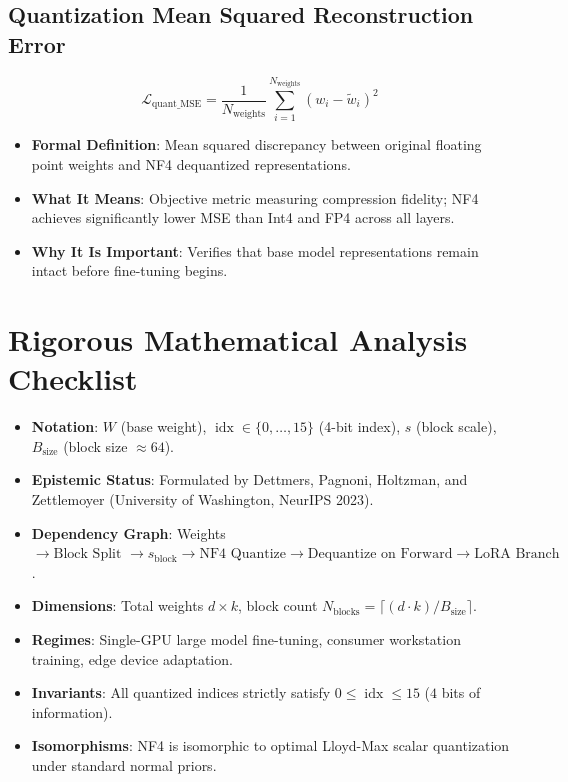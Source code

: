 \documentclass[11pt,a4paper]{article}
\theoremstyle{definition}
\begin{document}
\subsection{Quantization Mean Squared Reconstruction Error}
{\boldmath
\begin{equation}
\mathcal{L}_{\text{quant\_MSE}} = \frac{1}{N_{\text{weights}}}\sum_{i=1}^{N_{\text{weights}}} (w_i - \tilde{w}_i)^2
\end{equation}
}
\begin{itemize}
    \item \textbf{Formal Definition}: Mean squared discrepancy between original floating point weights and NF4 dequantized representations.
    \item \textbf{What It Means}: Objective metric measuring compression fidelity; NF4 achieves significantly lower MSE than Int4 and FP4 across all layers.
    \item \textbf{Why It Is Important}: Verifies that base model representations remain intact before fine-tuning begins.
\end{itemize}

\section{Rigorous Mathematical Analysis Checklist}

\begin{itemize}
    \item \textbf{Notation}: $W$ (base weight), $\operatorname{idx} \in \{0, \dots, 15\}$ (4-bit index), $s$ (block scale), $B_{\text{size}}$ (block size $\approx 64$).
    \item \textbf{Epistemic Status}: Formulated by Dettmers, Pagnoni, Holtzman, and Zettlemoyer (University of Washington, NeurIPS 2023).
    \item \textbf{Dependency Graph}: Weights $\to \text{Block Split } \to s_{\text{block}} \to \text{NF4 Quantize} \to \text{Dequantize on Forward} \to \text{LoRA Branch}$.
    \item \textbf{Dimensions}: Total weights $d \times k$, block count $N_{\text{blocks}} = \lceil (d \cdot k) / B_{\text{size}} \rceil$.
    \item \textbf{Regimes}: Single-GPU large model fine-tuning, consumer workstation training, edge device adaptation.
    \item \textbf{Invariants}: All quantized indices strictly satisfy $0 \le \operatorname{idx} \le 15$ ($4$ bits of information).
    \item \textbf{Isomorphisms}: NF4 is isomorphic to optimal Lloyd-Max scalar quantization under standard normal priors.
\end{itemize}
\end{document}
